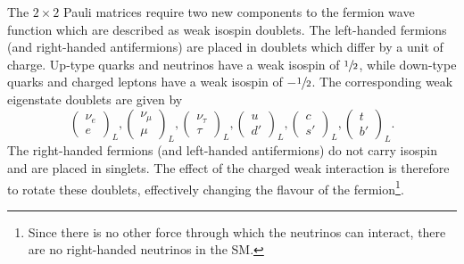 The $2 \times 2$ Pauli matrices require two new components to the fermion wave function which are described as weak isospin doublets.
The left-handed fermions (and right-handed antifermions)
are placed in doublets which differ by a unit of charge.
Up-type quarks and neutrinos have a weak isospin of $\sfrac{1}{2}$, while down-type quarks and charged leptons have a weak isospin of $-\sfrac{1}{2}$.
The corresponding weak eigenstate doublets are given by
\begin{equation}
    \label{eq:weak_isospin}
    \begin{pmatrix} \nu_e \\ e \end{pmatrix}_L,
    \begin{pmatrix} \nu_\mu \\ \mu \end{pmatrix}_L,
    \begin{pmatrix} \nu_\tau \\ \tau \end{pmatrix}_L,
    \begin{pmatrix} u \\ d' \end{pmatrix}_L,
    \begin{pmatrix} c \\ s' \end{pmatrix}_L,
    \begin{pmatrix} t \\ b' \end{pmatrix}_L.
\end{equation}
The right-handed fermions (and left-handed antifermions) do not carry isospin and are placed in singlets.
The effect of the charged weak interaction is therefore to rotate these doublets, effectively changing the flavour of the fermion\footnote{Since there is no other force through which the neutrinos can interact, there are no right-handed neutrinos in the SM.}.

